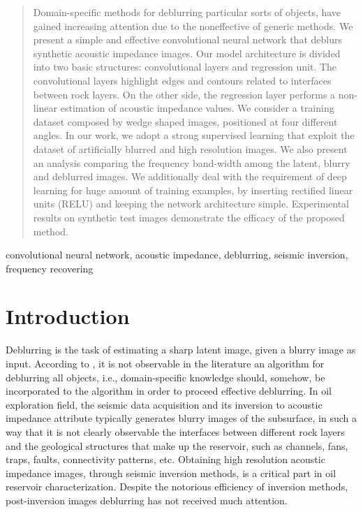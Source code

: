 \documentclass[conference]{IEEEtran}
\begin{document}
\begin{abstract}
Domain-specific methods for deblurring particular sorts of
objects, have gained increasing attention due to the noneffective
of generic methods.
We present a simple and effective convolutional
neural network that deblurs synthetic acoustic impedance images. 
Our model architecture is divided into two basic structures: convolutional layers and regression unit. The convolutional layers highlight edges and contours related to
interfaces between rock layers. On the other side, the regression layer
performs a non-linear estimation of acoustic impedance values.
We consider a training dataset composed by wedge shaped images, positioned at
four different angles. In our work, we adopt a strong supervised learning
that exploit the dataset of artificially blurred and high resolution images.
We also present an analysis comparing the frequency band-width among 
the latent, blurry and deblurred images.
We additionally deal with the requirement of deep learning for huge amount
of training examples, by inserting rectified linear units (RELU) and keeping
the network architecture simple. 
Experimental results on synthetic test images demonstrate the efficacy of the proposed method.
\end{abstract}

\begin{IEEEkeywords}
convolutional neural network, acoustic impedance, deblurring, seismic inversion, frequency recovering
\end{IEEEkeywords}

\section{Introduction}
Deblurring is the task of estimating a sharp latent image,
given a blurry image as input.
According to \cite{Grigorios2017}, it is not observable in the literature an algorithm for deblurring all objects, i.e., domain-specific knowledge should,
somehow, be incorporated to the algorithm in order to proceed effective deblurring.
In oil exploration field, the seismic data acquisition and its
inversion to acoustic impedance attribute typically generates
blurry images of the subsurface, in such a way that it is not
clearly observable the interfaces between different rock layers and
the geological structures that make up the reservoir, such as channels, fans, traps, faults,
connectivity patterns, etc.
Obtaining high resolution acoustic impedance images, through seismic inversion methods,
is a critical part in oil reservoir characterization.
Despite the notorious efficiency of inversion methods,
post-inversion images deblurring has not received much attention.
\end{document}
